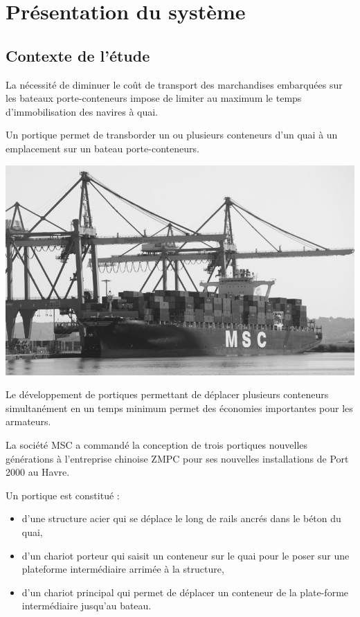 





\section{Présentation du système}

\subsection{Contexte de l'étude}

\begin{minipage}{0.55\linewidth}
La nécessité de diminuer le coût de transport des marchandises embarquées sur les bateaux  porte-conteneurs impose de limiter au maximum le temps d'immobilisation des navires à quai. 

Un portique permet de transborder un ou plusieurs conteneurs d'un quai à un emplacement sur un bateau porte-conteneurs.
\end{minipage}
\hfill
\begin{minipage}{0.4\linewidth}
 \centering\includegraphics[width=0.9\linewidth]{img/fig1}
\end{minipage}

Le développement de portiques permettant de déplacer plusieurs conteneurs simultanément en un temps minimum permet des économies importantes pour les armateurs.

La société MSC a commandé la conception de trois portiques \og nouvelles générations \fg à l'entreprise chinoise ZMPC pour ses nouvelles installations de Port 2000 au Havre.
	
Un portique est constitué :
\begin{itemize}
 \item d'une structure acier qui se déplace le long de rails ancrés dans le béton du quai,
 \item d'un chariot porteur qui saisit un conteneur sur le quai pour le poser sur une plateforme intermédiaire arrimée à la structure,
 \item d'un chariot principal qui permet de déplacer un conteneur de la plate-forme intermédiaire jusqu'au bateau.
\end{itemize}

